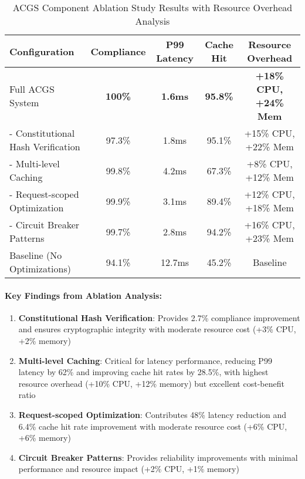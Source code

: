 \documentclass[manuscript,screen,9pt]{acmart}
\newcommand{\tablesize}{\footnotesize}
\newcommand{\tableheader}[1]{\textbf{#1}}
\begin{document}
\begin{table}[!htb]
\centering
\caption{ACGS Component Ablation Study Results with Resource Overhead Analysis}
\label{tab:ablation_study}
\tablesize
\begin{tabular}{@{}lcccc@{}}
\toprule
\tableheader{Configuration} & \tableheader{Compliance} & \tableheader{P99 Latency} & \tableheader{Cache Hit} & \tableheader{Resource Overhead} \\
\midrule
Full ACGS System & \textbf{100\%} & \textbf{1.6ms} & \textbf{95.8\%} & \textbf{+18\% CPU, +24\% Mem} \\
- Constitutional Hash Verification & 97.3\% & 1.8ms & 95.1\% & +15\% CPU, +22\% Mem \\
- Multi-level Caching & 99.8\% & 4.2ms & 67.3\% & +8\% CPU, +12\% Mem \\
- Request-scoped Optimization & 99.9\% & 3.1ms & 89.4\% & +12\% CPU, +18\% Mem \\
- Circuit Breaker Patterns & 99.7\% & 2.8ms & 94.2\% & +16\% CPU, +23\% Mem \\
Baseline (No Optimizations) & 94.1\% & 12.7ms & 45.2\% & Baseline \\
\bottomrule
\end{tabular}
\end{table}

\paragraph{Key Findings from Ablation Analysis:}
\begin{enumerate}[leftmargin=*,itemsep=1pt,parsep=1pt]
    \item \textbf{Constitutional Hash Verification}: Provides 2.7\% compliance improvement and ensures cryptographic integrity with moderate resource cost (+3\% CPU, +2\% memory)
    \item \textbf{Multi-level Caching}: Critical for latency performance, reducing P99 latency by 62\% and improving cache hit rates by 28.5\%, with highest resource overhead (+10\% CPU, +12\% memory) but excellent cost-benefit ratio
    \item \textbf{Request-scoped Optimization}: Contributes 48\% latency reduction and 6.4\% cache hit rate improvement with moderate resource cost (+6\% CPU, +6\% memory)
    \item \textbf{Circuit Breaker Patterns}: Provides reliability improvements with minimal performance and resource impact (+2\% CPU, +1\% memory)
\end{enumerate}
\end{document}
